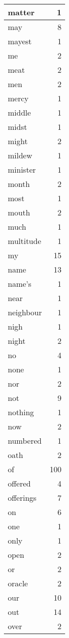 \begin{center}
\begin{longtable}{l|r}
matter & 1 \\ \hline
may & 8 \\ \hline
mayest & 1 \\ \hline
me & 2 \\ \hline
meat & 2 \\ \hline
men & 2 \\ \hline
mercy & 1 \\ \hline
middle & 1 \\ \hline
midst & 1 \\ \hline
might & 2 \\ \hline
mildew & 1 \\ \hline
minister & 1 \\ \hline
month & 2 \\ \hline
most & 1 \\ \hline
mouth & 2 \\ \hline
much & 1 \\ \hline
multitude & 1 \\ \hline
my & 15 \\ \hline
name & 13 \\ \hline
name's & 1 \\ \hline
near & 1 \\ \hline
neighbour & 1 \\ \hline
nigh & 1 \\ \hline
night & 2 \\ \hline
no & 4 \\ \hline
none & 1 \\ \hline
nor & 2 \\ \hline
not & 9 \\ \hline
nothing & 1 \\ \hline
now & 2 \\ \hline
numbered & 1 \\ \hline
oath & 2 \\ \hline
of & 100 \\ \hline
offered & 4 \\ \hline
offerings & 7 \\ \hline
on & 6 \\ \hline
one & 1 \\ \hline
only & 1 \\ \hline
open & 2 \\ \hline
or & 2 \\ \hline
oracle & 2 \\ \hline
our & 10 \\ \hline
out & 14 \\ \hline
over & 2 \\ \hline

\end{longtable}
\end{center}
